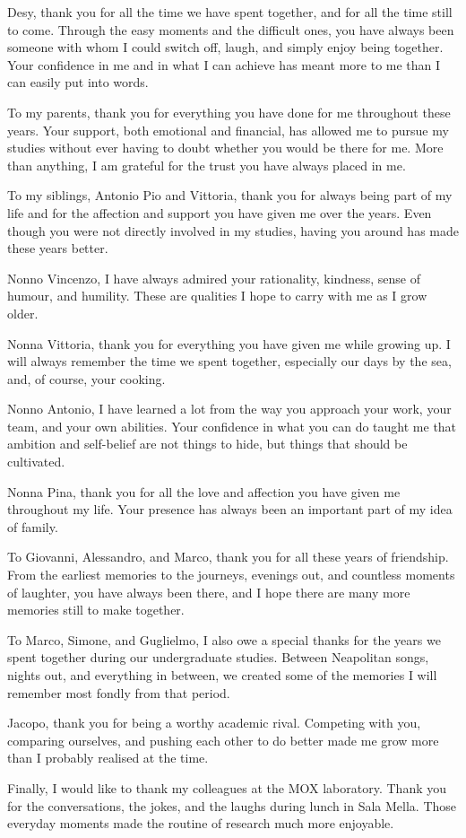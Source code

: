 \documentclass{Configuration_Files/PoliMi3i_thesis}
\begin{document}
Desy, thank you for all the time we have spent together, and for all the time still to come. Through the easy moments and the difficult ones, you have always been someone with whom I could switch off, laugh, and simply enjoy being together. Your confidence in me and in what I can achieve has meant more to me than I can easily put into words.

To my parents, thank you for everything you have done for me throughout these years. Your support, both emotional and financial, has allowed me to pursue my studies without ever having to doubt whether you would be there for me. More than anything, I am grateful for the trust you have always placed in me.

To my siblings, Antonio Pio and Vittoria, thank you for always being part of my life and for the affection and support you have given me over the years. Even though you were not directly involved in my studies, having you around has made these years better.

Nonno Vincenzo, I have always admired your rationality, kindness, sense of humour, and humility. These are qualities I hope to carry with me as I grow older.

Nonna Vittoria, thank you for everything you have given me while growing up. I will always remember the time we spent together, especially our days by the sea, and, of course, your cooking.

Nonno Antonio, I have learned a lot from the way you approach your work, your team, and your own abilities. Your confidence in what you can do taught me that ambition and self-belief are not things to hide, but things that should be cultivated.

Nonna Pina, thank you for all the love and affection you have given me throughout my life. Your presence has always been an important part of my idea of family.

To Giovanni, Alessandro, and Marco, thank you for all these years of friendship. From the earliest memories to the journeys, evenings out, and countless moments of laughter, you have always been there, and I hope there are many more memories still to make together.

To Marco, Simone, and Guglielmo, I also owe a special thanks for the years we spent together during our undergraduate studies. Between Neapolitan songs, nights out, and everything in between, we created some of the memories I will remember most fondly from that period.

Jacopo, thank you for being a worthy academic rival. Competing with you, comparing ourselves, and pushing each other to do better made me grow more than I probably realised at the time.

Finally, I would like to thank my colleagues at the MOX laboratory. Thank you for the conversations, the jokes, and the laughs during lunch in Sala Mella. Those everyday moments made the routine of research much more enjoyable.

\cleardoublepage
\end{document}
